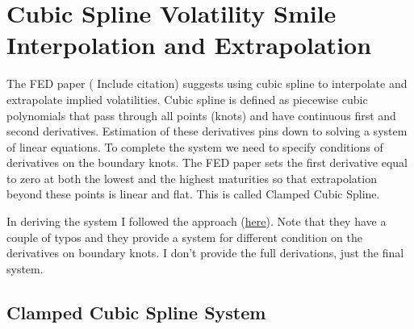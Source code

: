 \documentclass[12pt]{article}
\begin{document}
\section{Cubic Spline Volatility Smile Interpolation and Extrapolation}

The FED paper ({\color{red} Include citation}) suggests using cubic spline to interpolate and extrapolate implied volatilities. Cubic spline is defined as piecewise cubic polynomials that pass through all points (knots) and have continuous first and second derivatives. Estimation of these derivatives pins down to solving a system of linear equations. To complete the system we need to specify conditions of derivatives on the boundary knots. The FED paper sets the first derivative equal to zero at both the lowest and the highest maturities so that extrapolation beyond these points is linear and flat. This is called Clamped Cubic Spline.

In deriving the system I followed the approach (\href{http://cis.poly.edu/~mleung/CS3734/s03/ch07/cubicSpline.pdf}{here}). Note that they have a couple of typos and they provide a system for different condition on the derivatives on boundary knots. I don't provide the full derivations, just the final system. 

\subsection{Clamped Cubic Spline System}
\end{document}
